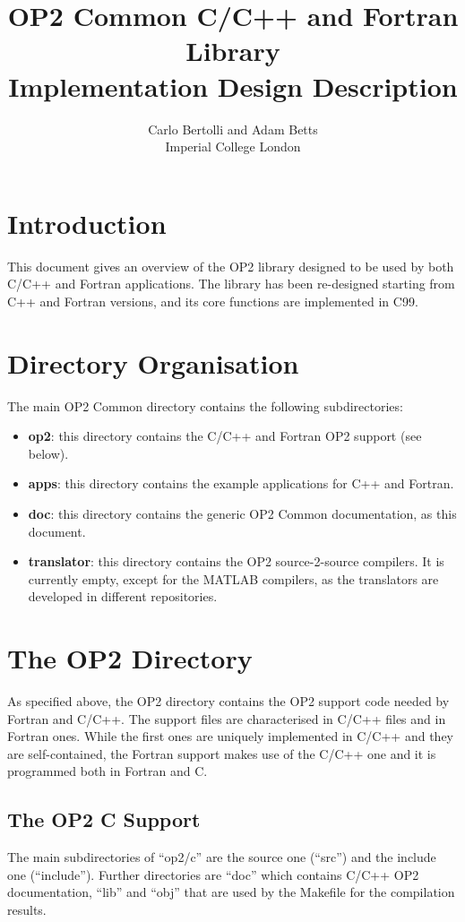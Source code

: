 \documentclass[a4paper]{article}
\title{OP2 Common C/C++ and Fortran Library \\ Implementation Design Description}
\author{Carlo Bertolli and Adam Betts\\ Imperial College London}
\begin{document}
\maketitle

\section{Introduction}
This document gives an overview of the OP2 library designed to be
used by both C/C++ and Fortran applications. The library has been
re-designed starting from C++ and Fortran versions, and its
core functions are implemented in C99.


\section{Directory Organisation}
The main OP2 Common directory contains the following subdirectories:

\begin{itemize}

\item {\bf op2}: this directory contains the C/C++ and Fortran OP2
  support (see below).

\item {\bf apps}: this directory contains the example applications for
  C++ and Fortran.

\item {\bf doc}: this directory contains the generic OP2 Common
  documentation, as this document.

\item {\bf translator}: this directory contains the OP2
  source-2-source compilers. It is currently empty, except for the
  MATLAB compilers, as the translators are developed in different
  repositories.

\end{itemize}

\section{The OP2 Directory}

As specified above, the OP2 directory contains the OP2 support code
needed by Fortran and C/C++. The support files are characterised in
C/C++ files and in Fortran ones. While the first ones are uniquely
implemented in C/C++ and they are self-contained, the Fortran support
makes use of the C/C++ one and it is programmed both in Fortran and C.

\subsection{The OP2 C Support}
The main subdirectories of ``op2/c'' are the source one (``src'') and
the include one (``include''). Further directories are ``doc'' which
contains C/C++ OP2 documentation, ``lib'' and ``obj'' that are used by
the Makefile for the compilation results.
\end{document}
